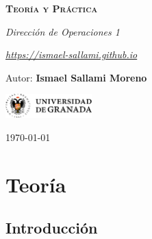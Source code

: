 \documentclass[12pt]{report} %
\begin{document}
\begin{titlepage}
    \begin{center}
        \vspace*{2cm}
        
        {\Huge \bfseries\scshape Teoría y Práctica \par}
        \vspace{0.5cm}
        {\Large \itshape Dirección de Operaciones 1 \par}
        \vspace{0.5cm}
        {\Large \itshape \href{https://ismael-sallami.github.io}{https://ismael-sallami.github.io} \par}


        \vfill
        
        {\LARGE Autor: \textbf{Ismael Sallami Moreno} \par}
        \vspace{0.3cm}
        
        \vspace{1cm}
        \includegraphics[width=0.25\textwidth]{../../../extraFiles/img/ugr.png} %
        \vspace{1cm}
        
        {\large \today}
    \end{center}
    
    \restoregeometry
\end{titlepage}


\thispagestyle{empty} %
\clearpage

\tableofcontents
\thispagestyle{empty} %
\clearpage

\part{Teoría}

\hypertarget{introducciuxf3n}{%
\chapter{Introducción}\label{introducciuxf3n}}
\end{document}
